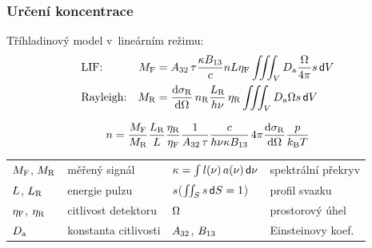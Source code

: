 \documentclass[10pt]{beamer}
\renewcommand\dd[1]{\,\mathsf{d}#1}
\begin{document}
\begin{frame}
	\frametitle{Určení koncentrace}
	Tříhladinový model v~lineárním režimu:
	\begin{align*}
		&\text{LIF:} &
		\lifsignal &= \einsteina32\,\lifetime
		\frac{\specoverlap \einsteinb13}{\lightspeed}
		\ndens \enlaser \lifeff
		\iiint_\vol \sensabs \frac{\solidangle}{4\pi} \beamprofile \dd{\vol} \\
		&\text{Rayleigh:} &
		\rayleighsignal &= \rayleighdxsect \, \rayleighndens
		\frac{\enlaserrayleigh}{\planck\freq} \, \rayleigheff
		\iiint_\vol \sensabs \solidangle \beamprofile \dd{\vol}
	\end{align*}
	\vspace{-3ex}
	\begin{block}{\vspace*{-2ex}}
		\begin{equation*}
			n = \frac{M_\text{F}}{M_\text{R}}
			\frac{L_\text{R}}{L}\frac{\eta_\text{R}}{\eta_\text{F}}
			\frac{1}{A_{32}\,\tau}
			\frac{c}{h\nu\kappa B_{13}}
			\, 4\pi \frac{\text{d}\sigma_\text{R}}{\text{d}\Omega} \frac{p}{k_\text{B}T}
		\end{equation*}
	\end{block}
	\medskip
	\small
	\centering
	\begin{tabular}{l l l l}
		$M_\text{F}$, $M_\text{R}$ & měřený signál &
		$\specoverlap = \int l(\freq)\,a(\freq) \dd{\freq}$
			& spektrální překryv \\
		$L$, $L_\text{R}$ & energie pulzu &
		$s$\quad($\iint_S \beamprofile \dd S = 1$) & profil svazku \\
		$\eta_\text{F}$, $\eta_\text{R}$ & citlivost detektoru &
		$\Omega$ & prostorový úhel \\
		$D_\text{a}$ & konstanta citlivosti &
		$A_{32}$, $B_{13}$ & Einsteinovy koef. \\
	\end{tabular}
\end{frame}
\end{document}
